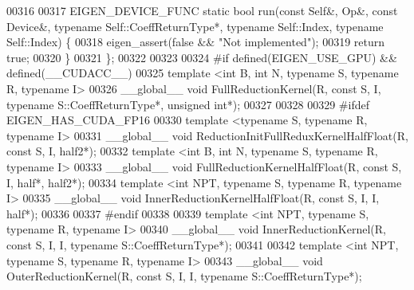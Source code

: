 \begin{DoxyCode}
00316 
00317   EIGEN\_DEVICE\_FUNC \textcolor{keyword}{static} \textcolor{keywordtype}{bool} run(\textcolor{keyword}{const} Self&, Op&, \textcolor{keyword}{const} Device&, \textcolor{keyword}{typename} Self::CoeffReturnType*, \textcolor{keyword}{
      typename} Self::Index, \textcolor{keyword}{typename} Self::Index) \{
00318     eigen\_assert(\textcolor{keyword}{false} && \textcolor{stringliteral}{"Not implemented"});
00319     \textcolor{keywordflow}{return} \textcolor{keyword}{true};
00320   \}
00321 \};
00322 
00323 
00324 \textcolor{preprocessor}{#if defined(EIGEN\_USE\_GPU) && defined(\_\_CUDACC\_\_)}
00325 \textcolor{keyword}{template} <\textcolor{keywordtype}{int} B, \textcolor{keywordtype}{int} N, \textcolor{keyword}{typename} S, \textcolor{keyword}{typename} R, \textcolor{keyword}{typename} I>
00326 \_\_global\_\_ \textcolor{keywordtype}{void} FullReductionKernel(R, \textcolor{keyword}{const} S, I, \textcolor{keyword}{typename} S::CoeffReturnType*, \textcolor{keywordtype}{unsigned} \textcolor{keywordtype}{int}*);
00327 
00328 
00329 \textcolor{preprocessor}{#ifdef EIGEN\_HAS\_CUDA\_FP16}
00330 \textcolor{keyword}{template} <\textcolor{keyword}{typename} S, \textcolor{keyword}{typename} R, \textcolor{keyword}{typename} I>
00331 \_\_global\_\_ \textcolor{keywordtype}{void} ReductionInitFullReduxKernelHalfFloat(R, \textcolor{keyword}{const} S, I, half2*);
00332 \textcolor{keyword}{template} <\textcolor{keywordtype}{int} B, \textcolor{keywordtype}{int} N, \textcolor{keyword}{typename} S, \textcolor{keyword}{typename} R, \textcolor{keyword}{typename} I>
00333 \_\_global\_\_ \textcolor{keywordtype}{void} FullReductionKernelHalfFloat(R, \textcolor{keyword}{const} S, I, half*, half2*);
00334 \textcolor{keyword}{template} <\textcolor{keywordtype}{int} NPT, \textcolor{keyword}{typename} S, \textcolor{keyword}{typename} R, \textcolor{keyword}{typename} I>
00335 \_\_global\_\_ \textcolor{keywordtype}{void} InnerReductionKernelHalfFloat(R, \textcolor{keyword}{const} S, I, I, half*);
00336 
00337 \textcolor{preprocessor}{#endif}
00338 
00339 \textcolor{keyword}{template} <\textcolor{keywordtype}{int} NPT, \textcolor{keyword}{typename} S, \textcolor{keyword}{typename} R, \textcolor{keyword}{typename} I>
00340 \_\_global\_\_ \textcolor{keywordtype}{void} InnerReductionKernel(R, \textcolor{keyword}{const} S, I, I, \textcolor{keyword}{typename} S::CoeffReturnType*);
00341 
00342 \textcolor{keyword}{template} <\textcolor{keywordtype}{int} NPT, \textcolor{keyword}{typename} S, \textcolor{keyword}{typename} R, \textcolor{keyword}{typename} I>
00343 \_\_global\_\_ \textcolor{keywordtype}{void} OuterReductionKernel(R, \textcolor{keyword}{const} S, I, I, \textcolor{keyword}{typename} S::CoeffReturnType*);

\end{DoxyCode}
